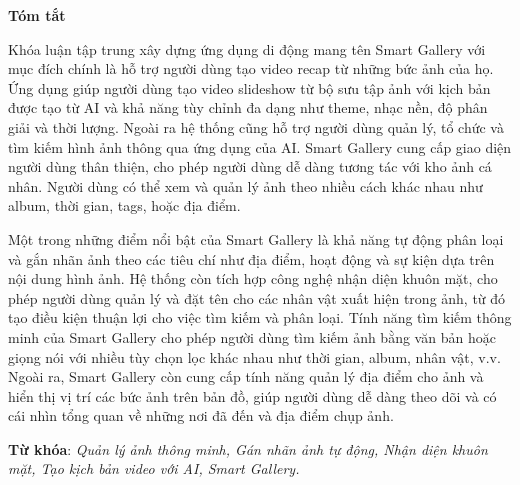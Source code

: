 \begin{center}
\textbf{\large{Tóm tắt}	}
\end{center}


\begin{small}
    Khóa luận tập trung xây dựng ứng dụng di động mang tên Smart Gallery với mục đích chính là hỗ trợ người dùng tạo video recap từ những bức ảnh của họ. Ứng dụng giúp người dùng tạo video slideshow từ bộ sưu tập ảnh với kịch bản được tạo từ AI và khả năng tùy chỉnh đa dạng như theme, nhạc nền, độ phân giải và thời lượng. Ngoài ra hệ thống cũng hỗ trợ người dùng quản lý, tổ chức và tìm kiếm hình ảnh thông qua ứng dụng của AI. Smart Gallery cung cấp giao diện người dùng thân thiện, cho phép người dùng dễ dàng tương tác với kho ảnh cá nhân. Người dùng có thể xem và quản lý ảnh theo nhiều cách khác nhau như album, thời gian, tags, hoặc địa điểm.

    Một trong những điểm nổi bật của Smart Gallery là khả năng tự động phân loại và gắn nhãn ảnh theo các tiêu chí như địa điểm, hoạt động và sự kiện dựa trên nội dung hình ảnh. Hệ thống còn tích hợp công nghệ nhận diện khuôn mặt, cho phép người dùng quản lý và đặt tên cho các nhân vật xuất hiện trong ảnh, từ đó tạo điều kiện thuận lợi cho việc tìm kiếm và phân loại. Tính năng tìm kiếm thông minh của Smart Gallery cho phép người dùng tìm kiếm ảnh bằng văn bản hoặc giọng nói với nhiều tùy chọn lọc khác nhau như thời gian, album, nhân vật, v.v. Ngoài ra, Smart Gallery còn cung cấp tính năng quản lý địa điểm cho ảnh và hiển thị vị trí các bức ảnh trên bản đồ, giúp người dùng dễ dàng theo dõi và có cái nhìn tổng quan về những nơi đã đến và địa điểm chụp ảnh.


\vspace*{1cm}
\textbf{Từ khóa}: 
\textit{Quản lý ảnh thông minh, Gán nhãn ảnh tự động, Nhận diện khuôn mặt, Tạo kịch bản video với AI, Smart Gallery.}
\end{small}